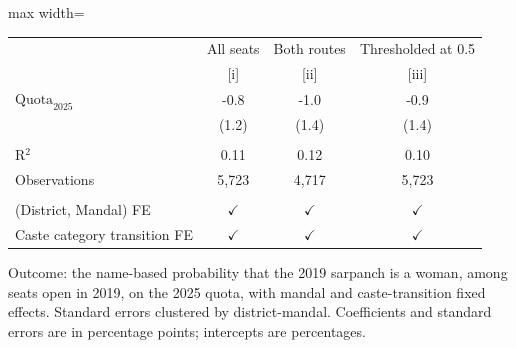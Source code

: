 
\begingroup
\centering
\scriptsize
\begin{adjustbox}{max width=\linewidth}
   \begin{threeparttable}[b]
      \begin{tabular}{lccc}
         \toprule
                                      & All seats     & Both routes   & Thresholded at 0.5 \\
                                      & [i]           & [ii]          & [iii]\\
         \midrule
         $\text{Quota}_{2025}$        & -0.8          & -1.0          & -0.9\\
                                      & (1.2)         & (1.4)         & (1.4)\\
          \\
         R$^2$                        & 0.11          & 0.12          & 0.10\\
         Observations                 & 5,723         & 4,717         & 5,723\\
          \\
         (District, Mandal) FE        & $\checkmark$  & $\checkmark$  & $\checkmark$\\
         Caste category transition FE & $\checkmark$  & $\checkmark$  & $\checkmark$\\
         \bottomrule
      \end{tabular}

      \begin{tablenotes}
         \item Outcome: the name-based probability that the 2019 sarpanch is a woman, among seats open in 2019, on the 2025 quota, with mandal and caste-transition fixed effects. Standard errors clustered by district-mandal. Coefficients and standard errors are in percentage points; intercepts are percentages.
      \end{tablenotes}
   \end{threeparttable}
\end{adjustbox}
\par\endgroup


